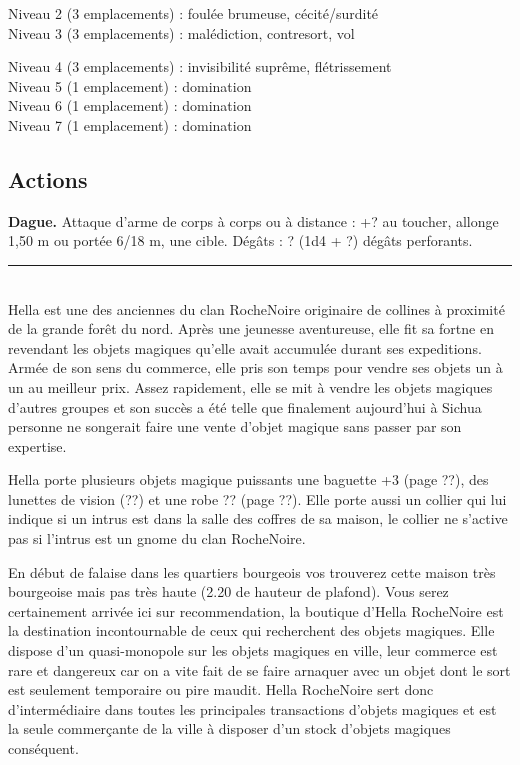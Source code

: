 \begin{figure*}[tb!]
{\begin{minipage}[c]{.45\linewidth}
Niveau 2 (3 emplacements) : foulée brumeuse, cécité/surdité\\
Niveau 3 (3 emplacements) : malédiction, contresort, vol
 \end{minipage}
  \hspace{4pt}
 \begin{minipage}[c]{.45\linewidth}
Niveau 4 (3 emplacements) : invisibilité suprême, flétrissement\\
Niveau 5 (1 emplacement) : domination \\
Niveau 6 (1 emplacement) : domination \\
Niveau 7 (1 emplacement) : domination
 \vspace{-10pt}
    \subsection*{Actions}
    {\bfseries Dague.} Attaque d'arme de corps à corps ou à distance : +? au toucher, allonge 1,50 m ou portée 6/18 m,
         une cible. Dégâts : ? (1d4 + ?) dégâts perforants. \\
   \noindent\rule{\textwidth}{1pt} \\
Hella est une des anciennes du clan RocheNoire originaire de collines à 
proximité de la grande forêt du nord. Après une jeunesse aventureuse, elle 
fit sa fortne en revendant les objets magiques qu'elle avait accumulée durant 
ses expeditions. Armée de son sens du commerce, elle pris son temps pour vendre
ses objets un à un au meilleur prix. Assez rapidement, elle se mit à vendre les
objets magiques d'autres groupes et son succès a été telle que finalement 
aujourd'hui à Sichua personne ne songerait faire une vente d'objet magique 
sans passer par son expertise.

Hella porte plusieurs objets magique puissants une baguette +3 (page ??), des 
lunettes de vision (??) et une robe ?? (page ??). Elle porte aussi un collier 
qui lui indique si un intrus est dans la salle des coffres de sa maison, le 
collier ne s'active pas si l'intrus est un gnome du clan RocheNoire.

\end{minipage}
}%
\end{figure*}

En début de falaise dans les quartiers bourgeois vos trouverez cette
maison très bourgeoise mais pas très haute (2.20 de hauteur de plafond).
Vous serez certainement arrivée ici sur recommendation, la boutique 
d'Hella RocheNoire est la destination incontournable de ceux qui 
recherchent des objets magiques. Elle dispose d'un quasi-monopole sur
les objets magiques en ville, leur commerce est rare et dangereux car
on a vite fait de se faire arnaquer avec un objet dont le sort est 
seulement temporaire ou pire maudit. Hella RocheNoire sert donc 
d'intermédiaire dans toutes les principales transactions d'objets
magiques et est la seule commerçante de la ville à disposer d'un stock
d'objets magiques conséquent.

